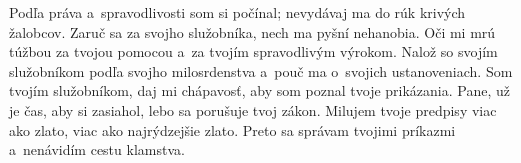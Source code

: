 Podľa práva a~spravodlivosti som si počínal;
nevydávaj ma do rúk krivých žalobcov.
\versseparator
Zaruč sa za svojho služobníka,
nech ma pyšní nehanobia.
\versseparator
Oči mi mrú túžbou za tvojou pomocou
a~za tvojím spravodlivým výrokom.
\versseparator
Nalož so svojím služobníkom podľa svojho milosrdenstva
a~pouč ma o~svojich ustanoveniach.
\versseparator
Som tvojím služobníkom,
daj mi chápavosť, aby som poznal tvoje prikázania.
\versseparator
Pane, už je čas, aby si zasiahol,
lebo sa porušuje tvoj zákon.
\versseparator
Milujem tvoje predpisy
viac ako zlato, viac ako najrýdzejšie zlato.
\versseparator
Preto sa správam tvojimi príkazmi
a~nenávidím cestu klamstva.